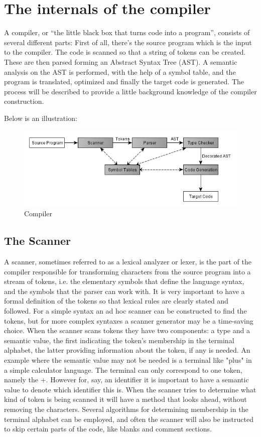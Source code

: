 \section{The internals of the compiler}

A compiler, or ``the little black box that turns code into a program'', consists of several different parts: First of all, there's the source program which is the input to the compiler. The code is scanned so that a string of tokens can be created. These are then parsed forming an Abstract Syntax Tree (AST). A semantic analysis on the AST is performed, with the help of a symbol table, and the program is translated, optimized and finally the target code is generated. The process will be described to provide a little background knowledge of the compiler construction. 

Below is an illustration:

\begin{figure}[ht]
	\centering
		\includegraphics{img/compiler.png}
	\caption{Compiler}
	\label{fig:compiler}
\end{figure}


\subsection{The Scanner}

A scanner, sometimes referred to as a lexical analyzer or lexer, is the part of the compiler responsible for transforming characters from the source program into a stream of tokens, i.e. the elementary symbols that define the language syntax, and the symbols that the parser can work with.
It is very important to have a formal definition of the tokens so that lexical rules are clearly stated and followed.
For a simple syntax an ad hoc scanner can be constructed to find the tokens, but for more complex syntaxes a scanner generator may be a time-saving choice.
When the scanner scans tokens they have two components: a type and a semantic value, the first indicating the token's membership in the terminal alphabet, the latter providing information about the token, if any is needed.
An example where the semantic value may not be needed is a terminal like "plus" in a simple calculator language. The terminal can only correspond to one token, namely the +. However for, say, an identifier it is important to have a semantic value to denote which identifier this is.
When the scanner tries to determine what kind of token is being scanned it will have a method that looks ahead, without removing the characters. Several algorithms for determining membership in the terminal alphabet can be employed, and often the scanner will also be instructed to skip certain parts of the code, like blanks and comment sections.

